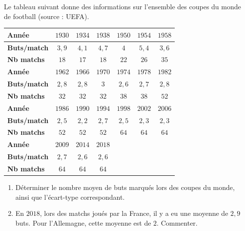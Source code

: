 \begin{exo}
	Le tableau suivant donne des informations sur l'ensemble des coupes du monde de football (source : UEFA).

	\footnotesize
	\begin{center}
		\def\arraystretch{1.5}
		\begin{tabular}{|l|*{6}{c|}} \hline
			\textbf{\scriptsize Année}      & $1930$ & $1934$ & $1938$ & $1950$ & $1954$ & $1958$ \\ \hline
			\textbf{\scriptsize Buts/match} & $3,9$  & $4,1$  & $4,7$  & $4$    & $5,4$  & $3,6$  \\ \hline
			\textbf{\scriptsize Nb matchs}  & $18$   & $17$   & $18$   & $22$   & $26$   & $35$   \\ \hline\hline
			\textbf{\scriptsize Année}      & $1962$ & $1966$ & $1970$ & $1974$ & $1978$ & $1982$ \\ \hline
			\textbf{\scriptsize Buts/match} & $2,8$  & $2,8$  & $3$    & $2,6$  & $2,7$  & $2,8$  \\ \hline
			\textbf{\scriptsize Nb matchs}  & $32$   & $32$   & $32$   & $38$   & $38$   & $52$   \\ \hline\hline
			\textbf{\scriptsize Année}      & $1986$ & $1990$ & $1994$ & $1998$ & $2002$ & $2006$ \\ \hline
			\textbf{\scriptsize Buts/match} & $2,5$  & $2,2$  & $2,7$  & $2,5$  & $2,3$  & $2,3$  \\ \hline
			\textbf{\scriptsize Nb matchs}  & $52$   & $52$   & $52$   & $64$   & $64$   & $64$   \\ \hline\hline
			\textbf{\scriptsize Année}      & $2009$ & $2014$ & $2018$ &        &        &        \\ \hline
			\textbf{\scriptsize Buts/match} & $2,7$  & $2,6$  & $2,6$  &        &        &        \\ \hline
			\textbf{\scriptsize Nb matchs}  & $64$   & $64$   & $64$   &        &        &        \\ \hline
		\end{tabular}
	\end{center}
	\normalsize

	\begin{enumerate}
		\item Déterminer le nombre moyen de buts marqués lors des coupes du monde, ainsi que l'écart-type correspondant.
		\item En $2018$, lors des matchs joués par la France, il y a eu une moyenne de $2,9$ buts. Pour l'Allemagne, cette moyenne est de $2$. Commenter.
	\end{enumerate}
\end{exo}
